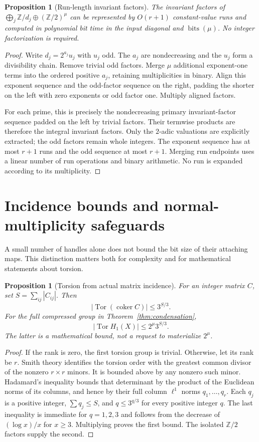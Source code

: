 \documentclass[11pt]{article}
\newtheorem{proposition}[theorem]{Proposition}
\theoremstyle{definition}
\theoremstyle{remark}
\newcommand{\Z}{\mathbb Z}
\newcommand{\coker}{\operatorname{coker}}
\newcommand{\Tor}{\operatorname{Tor}}
\newcommand{\bits}{\operatorname{bits}}
\begin{document}
\begin{proposition}[Run-length invariant factors]
\label{prop:torsion-runs}
The invariant factors of
$\bigoplus_j\Z/d_j\oplus(\Z/2)^\mu$ can be represented by $O(r+1)$
constant-value runs and computed in polynomial bit time in the input
diagonal and $\bits(\mu)$. No integer factorization is required.
\end{proposition}
\begin{proof}
Write $d_j=2^{a_j}u_j$ with $u_j$ odd. The $a_j$ are nondecreasing and the
$u_j$ form a divisibility chain. Remove trivial odd factors. Merge $\mu$
additional exponent-one terms into the ordered positive $a_j$, retaining
multiplicities in binary. Align this exponent sequence and the odd-factor
sequence on the right, padding the shorter on the left with zero exponents
or odd factor one. Multiply aligned factors.

For each prime, this is precisely the nondecreasing primary invariant-factor
sequence padded on the left by trivial factors. Their termwise products
are therefore the integral invariant factors. Only the $2$-adic valuations
are explicitly extracted; the odd factors remain whole integers.
The exponent sequence has at most $r+1$ runs and the odd sequence at most
$r+1$. Merging run endpoints uses a linear number of run operations and
binary arithmetic. No run is expanded according to its multiplicity.
\end{proof}

\section{Incidence bounds and normal-multiplicity safeguards}
\label{sec:torsion-bound}

A small number of handles alone does not bound the bit size of their
attaching maps. This distinction matters both for complexity and for
mathematical statements about torsion.

\begin{proposition}[Torsion from actual matrix incidence]
\label{prop:mass}
For an integer matrix $C$, set $S=\sum_{ij}|C_{ij}|$. Then
\[
 |\Tor(\coker C)|\leq 3^{S/3}.
\]
For the full compressed group in Theorem~\ref{thm:condensation},
\[
 |\Tor H_1(X)|\leq 2^\mu3^{S/3}.
\]
The latter is a mathematical bound, not a request to materialize $2^\mu$.
\end{proposition}
\begin{proof}
If the rank is zero, the first torsion group is trivial. Otherwise, let its
rank be $r$. Smith theory identifies the torsion order with the greatest
common divisor of the nonzero $r\times r$ minors. It is bounded above by
any nonzero such minor. Hadamard's inequality bounds that determinant by
the product of the Euclidean norms of its columns, and hence by their full
column $\ell^1$ norms $q_1,\ldots,q_r$. Each $q_j$ is a positive integer,
$\sum q_j\leq S$, and $q\leq3^{q/3}$ for every positive integer $q$.
The last inequality is immediate for $q=1,2,3$ and follows from the decrease
of $(\log x)/x$ for $x\geq3$. Multiplying proves the first bound. The isolated
$\Z/2$ factors supply the second.
\end{proof}
\end{document}
